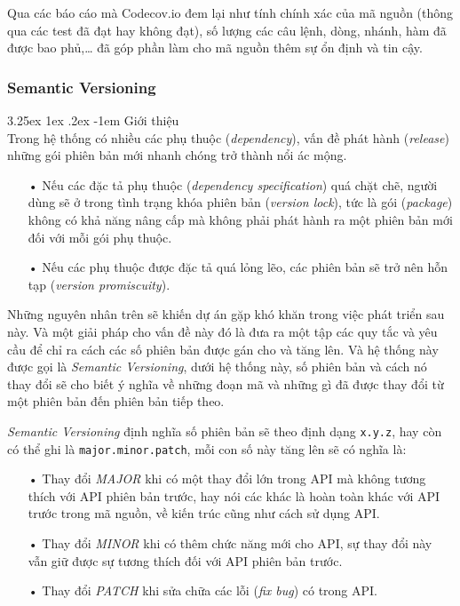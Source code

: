 \documentclass[12pt,a4paper,twoside]{article}
\makeatletter
\newcommand{\myparagraph}[1]{\paragraph{#1}\mbox{}\\} %
\renewcommand\paragraph{\@startsection{paragraph}{5}{\z@}%
  {3.25ex \@plus1ex \@minus.2ex}%
  {-1em}%
  {\normalfont\normalsize\bfseries}}
\makeatother
\begin{document}
Qua các báo cáo mà Codecov.io đem lại như tính chính xác của mã nguồn (thông qua các test đã đạt hay không đạt), số lượng các câu lệnh, dòng, nhánh, hàm đã được bao phủ,… đã góp phần làm cho mã nguồn thêm sự ổn định và tin cậy.

\subsubsection{Semantic Versioning}
\myparagraph{Giới thiệu}
Trong hệ thống có nhiều các phụ thuộc (\textit{dependency}), vấn đề phát hành (\textit{release}) những gói phiên bản mới nhanh chóng trở thành nổi ác mộng. 

\begin{itemize}
\item[•] Nếu các đặc tả phụ thuộc (\textit{dependency specification}) quá chặt chẽ, người dùng sẽ ở trong tình trạng khóa phiên bản (\textit{version lock}), tức là gói (\textit{package}) không có khả năng nâng cấp mà không phải phát hành ra một phiên bản mới đối với mỗi gói phụ thuộc.
\item[•] Nếu các phụ thuộc được đặc tả quá lỏng lẽo, các phiên bản sẽ trở nên hỗn tạp (\textit{version promiscuity}).
\end{itemize}

Những nguyên nhân trên sẽ khiến dự án gặp khó khăn trong việc phát triển sau này. Và một giải pháp cho vấn đề này đó là đưa ra một tập các quy tắc và yêu cầu để chỉ ra cách các số phiên bản được gán cho và tăng lên. Và hệ thống này được gọi là \textit{Semantic Versioning}, dưới hệ thống này, số phiên bản và cách nó thay đổi sẽ cho biết ý nghĩa về những đoạn mã và những gì đã được thay đổi từ một phiên bản đến phiên bản tiếp theo.

\textit{Semantic Versioning} định nghĩa số phiên bản sẽ theo định dạng \texttt{x.y.z}, hay còn có thể ghi là \texttt{major.minor.patch}, mỗi con số này tăng lên sẽ có nghĩa là:
\begin{itemize}
\item[•] Thay đổi \textit{MAJOR} khi có một thay đổi lớn trong API mà không tương thích với API phiên bản trước, hay nói các khác là hoàn toàn khác với API trước trong mã nguồn, về kiến trúc cũng như cách sử dụng API.
\item[•] Thay đổi \textit{MINOR} khi có thêm chức năng mới cho API, sự thay đổi này vẫn giữ được sự tương thích đối với API phiên bản trước.
\item[•] Thay đổi \textit{PATCH} khi sửa chữa các lỗi (\textit{fix bug}) có trong API.
\end{itemize}
\end{document}
